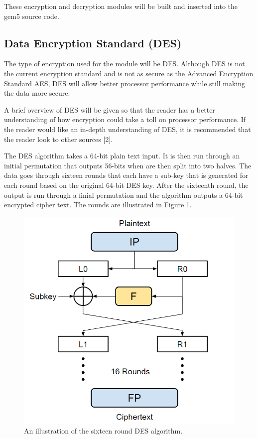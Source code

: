 \documentclass[letterpaper, 10 pt, conference]{ieeeconf}  %
\begin{document}
These encryption and decryption modules will be built and inserted into the gem5 source code.

\subsection{Data Encryption Standard (DES)}

The type of encryption used for the module will be DES.  Although DES is not the current encryption standard and is not as secure as the Advanced Encryption Standard AES, DES will allow better processor performance while still making the data more secure.

A brief overview of DES will be given so that the reader has a better understanding of how encryption could take a toll on processor performance.  If the reader would like an in-depth understanding of DES, it is recommended that the reader look to other sources [2].

The DES algorithm takes a 64-bit plain text input.  It is then run through an initial permutation that outputs 56-bits when are then split into two halves.  The data goes through sixteen rounds that each have a sub-key that is generated for each round based on the original 64-bit DES key.  After the sixteenth round, the output is run through a finial permutation and the algorithm outputs a 64-bit encrypted cipher text.  The rounds are illustrated in Figure 1.

\begin{figure}[thpb]
	\centering
	\includegraphics[scale=.50]{DesRounds}
    \caption{An illustration of the sixteen round DES algorithm.}
\end{figure}
\end{document}
